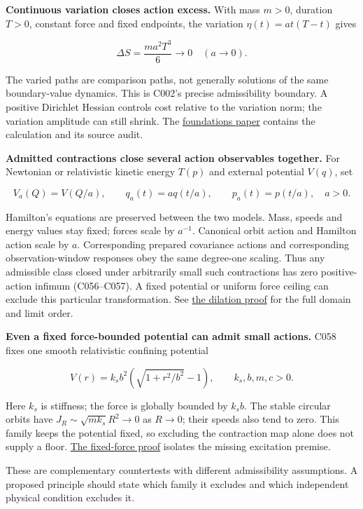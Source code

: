 \documentclass[11pt,a4paper]{article}
\begin{document}
\textbf{Continuous variation closes action excess.} With mass \(m>0\),
duration \(T>0\), constant force and fixed endpoints, the variation
\(\eta(t)=a t(T-t)\) gives

\[\Delta S=\frac{ma^2T^3}{6}\longrightarrow0\quad(a\longrightarrow0).\]

The varied paths are comparison paths, not generally solutions of the
same boundary-value dynamics. This is C002's precise admissibility
boundary. A positive Dirichlet Hessian controls cost relative to the
variation norm; the variation amplitude can still shrink. The
\href{../papers/action-gap-foundations.tex}{foundations paper} contains
the calculation and its source audit.

\textbf{Admitted contractions close several action observables
together.} For Newtonian or relativistic kinetic energy \(T(p)\) and
external potential \(V(q)\), set

\[V_a(Q)=V(Q/a),\qquad q_a(t)=a q(t/a),\qquad p_a(t)=p(t/a),\quad a>0.\]

Hamilton's equations are preserved between the two models. Mass, speeds
and energy values stay fixed; forces scale by \(a^{-1}\). Canonical
orbit action and Hamilton action scale by \(a\). Corresponding prepared
covariance actions and corresponding observation-window responses obey
the same degree-one scaling. Thus any admissible class closed under
arbitrarily small such contractions has zero positive-action infimum
(C056--C057). A fixed potential or uniform force ceiling can exclude
this particular transformation. See \href{action-scale-dilation.md}{the
dilation proof} for the full domain and limit order.

\textbf{Even a fixed force-bounded potential can admit small actions.}
C058 fixes one smooth relativistic confining potential

\[V(r)=k_s b^2\left(\sqrt{1+r^2/b^2}-1\right),\qquad k_s,b,m,c>0.\]

Here \(k_s\) is stiffness; the force is globally bounded by \(k_s b\).
The stable circular orbits have \(J_R\sim\sqrt{mk_s}R^2\to0\) as
\(R\to0\); their speeds also tend to zero. This family keeps the
potential fixed, so excluding the contraction map alone does not supply
a floor. \href{fixed-force-small-circles.md}{The fixed-force proof}
isolates the missing excitation premise.

These are complementary countertests with different admissibility
assumptions. A proposed principle should state which family it excludes
and which independent physical condition excludes it.
\end{document}
